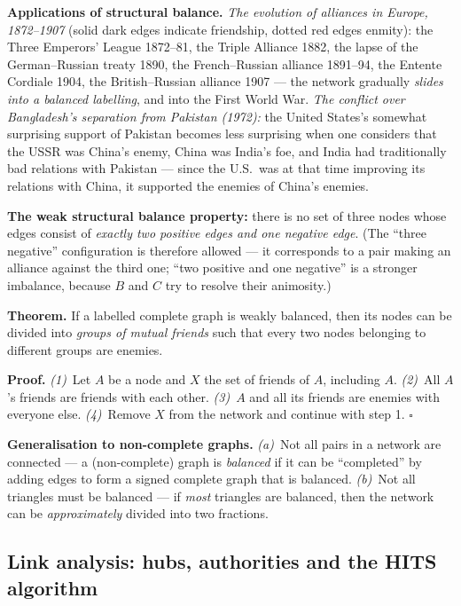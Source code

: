 \documentclass[11pt,a4paper]{article}
\theoremstyle{definition}
\providecommand{\uv}[1]{``#1''}
\begin{document}
\textbf{Applications of structural balance.} \emph{The evolution of alliances in Europe, 1872--1907}
(solid dark edges indicate friendship, dotted red edges enmity): the Three Emperors' League
1872--81, the Triple Alliance 1882, the lapse of the German--Russian treaty 1890, the
French--Russian alliance 1891--94, the Entente Cordiale 1904, the British--Russian alliance 1907 ---
the network gradually \emph{slides into a balanced labelling}, and into the First World War.
\emph{The conflict over Bangladesh's separation from Pakistan (1972):} the United States's somewhat
surprising support of Pakistan becomes less surprising when one considers that the USSR was China's
enemy, China was India's foe, and India had traditionally bad relations with Pakistan --- since the
U.S.\ was at that time improving its relations with China, it supported the enemies of China's
enemies.

\begin{defbox}
\textbf{The weak structural balance property:} there is no set of three nodes whose edges consist of
\emph{exactly two positive edges and one negative edge}. (The \uv{three negative} configuration is
therefore allowed --- it corresponds to a pair making an alliance against the third one; \uv{two
positive and one negative} is a stronger imbalance, because $B$ and $C$ try to resolve their
animosity.)

\textbf{Theorem.} If a labelled complete graph is weakly balanced, then its nodes can be divided into
\emph{groups of mutual friends} such that every two nodes belonging to different groups are enemies.

\textbf{Proof.} \emph{(1)}~Let $A$ be a node and $X$ the set of friends of $A$, including $A$.
\emph{(2)}~All $A$'s friends are friends with each other. \emph{(3)}~$A$ and all its friends are
enemies with everyone else. \emph{(4)}~Remove $X$ from the network and continue with step 1.
$\square$

\textbf{Generalisation to non-complete graphs.} \emph{(a)}~Not all pairs in a network are connected
--- a (non-complete) graph is \emph{balanced} if it can be \uv{completed} by adding edges to form a
signed complete graph that is balanced. \emph{(b)}~Not all triangles must be balanced --- if
\emph{most} triangles are balanced, then the network can be \emph{approximately} divided into two
fractions.
\end{defbox}

\subsection{Link analysis: hubs, authorities and the HITS algorithm}
\end{document}
